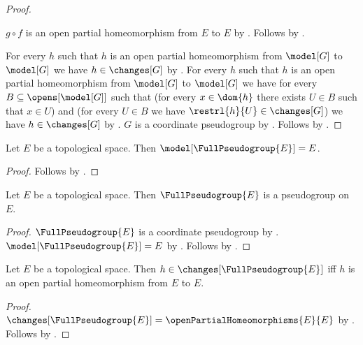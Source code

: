 \begin{proof}
\begin{subproof}
        $g\circ f$ is an open partial homeomorphism from $E$ to $E$ by
            .
        Follows by .
    \end{subproof}
    For every $h$ such that $h$ is an open partial homeomorphism from
        $\model[G]$ to $\model[G]$ we have $h\in\changes[G]$ by
        .
    For every $h$ such that $h$ is an open partial homeomorphism
        from $\model[G]$ to $\model[G]$ we have
        for every $B\subseteq\opens[\model[G]]$ such that
            (for every $x\in\dom{h}$ there exists $U\in B$ such that $x\in U$) and
            (for every $U\in B$ we have $\restrl{h}{U}\in\changes[G]$)
        we have $h\in\changes[G]$ by \auto.
    $G$ is a coordinate pseudogroup by .
    Follows by .
\end{proof}

\begin{theorem}\label{full_pseudogroup_model}
    Let $E$ be a topological space.
    Then $\model[\FullPseudogroup{E}]=E$.
\end{theorem}
\begin{proof}
    Follows by .
\end{proof}

\begin{classification}\label{full_pseudogroup_on}
    Let $E$ be a topological space.
    Then $\FullPseudogroup{E}$ is a pseudogroup on $E$.
\end{classification}
\begin{proof}
    $\FullPseudogroup{E}$ is a coordinate pseudogroup by .
    $\model[\FullPseudogroup{E}]=E$ by .
    Follows by .
\end{proof}

\begin{theorem}\label{full_pseudogroup_changes}
    Let $E$ be a topological space.
    Then $h\in\changes[\FullPseudogroup{E}]$ iff
        $h$ is an open partial homeomorphism from $E$ to $E$.
\end{theorem}
\begin{proof}
    $\changes[\FullPseudogroup{E}]=\openPartialHomeomorphisms{E}{E}$ by
        .
    Follows by .
\end{proof}

